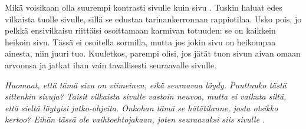 \documentclass[a4paper, 12pt, finnish]{article}
\newcommand{\reader}[1]{\emph{#1}}
\begin{document}
Mikä voisikaan olla suurempi kontrasti sivulle \pageref{aatelinen}
kuin sivu \pageref{weirdpage}. Tuskin haluat edes vilkaista tuolle
sivulle, sillä se edustaa tarinankerronnan rappiotilaa.
Usko pois, jo pelkkä ensivilkaisu riittäisi osoittamaan
karmivan totuuden: se on kaikkein heikoin sivu.
Tässä ei osoitella sormilla, mutta jos
jokin sivu on heikompaa ainesta, niin juuri tuo.
Kuuletkos, parempi olisi, jos jätät tuon sivun aivan
omaan arvoonsa ja jatkat ihan vain tavallisesti seuraavalle sivulle.

\reader{Huomaat, että tämä sivu on viimeinen, eikä seuraavaa löydy.
Puuttuuko tästä sittenkin sivuja? Taisit vilkaista
sivulle \pageref{weirdpage} vastoin neuvoa, mutta ei
vaikuta siltä, että sieltä löytyisi jatko-ohjeita.  
Onkohan tämä se hätätilanne, josta otsikko
kertoo?
Eihän tässä ole vaihtoehtojakaan, joten seuraavaksi siis sivulle \pageref{intermission}.}
\label{lastpage}
\end{document}
